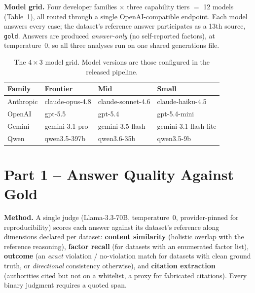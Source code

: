 \documentclass{article}
\begin{document}
\textbf{Model grid.} Four developer families $\times$ three capability tiers $=$ 12 models
(Table~\ref{tab:models}), all routed through a single OpenAI-compatible endpoint. Each model
answers every case; the dataset's reference answer participates as a 13th source,
\texttt{gold}. Answers are produced \emph{answer-only} (no self-reported factors), at
temperature~0, so all three analyses run on one shared generations file.

\begin{table}[t]
\caption{The $4\times3$ model grid. Model versions are those configured in the released pipeline.}
\label{tab:models}
\centering
\begin{tabular}{llll}
\toprule
Family & Frontier & Mid & Small \\
\midrule
Anthropic & claude-opus-4.8 & claude-sonnet-4.6 & claude-haiku-4.5 \\
OpenAI    & gpt-5.5 & gpt-5.4 & gpt-5.4-mini \\
Gemini    & gemini-3.1-pro & gemini-3.5-flash & gemini-3.1-flash-lite \\
Qwen      & qwen3.5-397b & qwen3.6-35b & qwen3.5-9b \\
\bottomrule
\end{tabular}
\end{table}

\section{Part 1 -- Answer Quality Against Gold}

\textbf{Method.} A single judge (Llama-3.3-70B, temperature~0, provider-pinned for
reproducibility) scores each answer against its dataset's reference along dimensions declared
per dataset: \textbf{content similarity} (holistic overlap with the reference reasoning),
\textbf{factor recall} (for datasets with an enumerated factor list), \textbf{outcome} (an
\emph{exact} violation / no-violation match for datasets with clean ground truth, or
\emph{directional} consistency otherwise), and \textbf{citation extraction} (authorities cited
but not on a whitelist, a proxy for fabricated citations). Every binary judgment requires a
quoted span.
\end{document}
